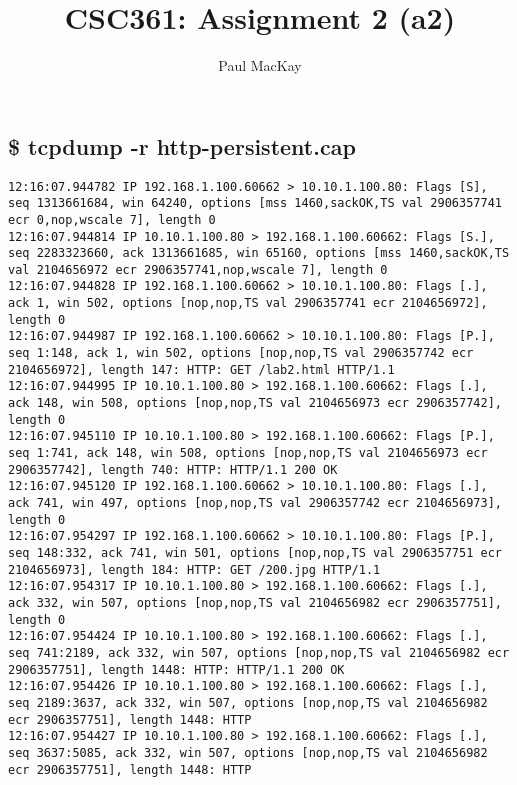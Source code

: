 \documentclass{article}
\title{CSC361: Assignment 2 (a2)}
\author{Paul MacKay}
\begin{document}
\maketitle

\section{}
\subsection{\$ tcpdump -r http-persistent.cap}
{\scriptsize
\begin{lstlisting}
12:16:07.944782 IP 192.168.1.100.60662 > 10.10.1.100.80: Flags [S], seq 1313661684, win 64240, options [mss 1460,sackOK,TS val 2906357741 ecr 0,nop,wscale 7], length 0
12:16:07.944814 IP 10.10.1.100.80 > 192.168.1.100.60662: Flags [S.], seq 2283323660, ack 1313661685, win 65160, options [mss 1460,sackOK,TS val 2104656972 ecr 2906357741,nop,wscale 7], length 0
12:16:07.944828 IP 192.168.1.100.60662 > 10.10.1.100.80: Flags [.], ack 1, win 502, options [nop,nop,TS val 2906357741 ecr 2104656972], length 0
12:16:07.944987 IP 192.168.1.100.60662 > 10.10.1.100.80: Flags [P.], seq 1:148, ack 1, win 502, options [nop,nop,TS val 2906357742 ecr 2104656972], length 147: HTTP: GET /lab2.html HTTP/1.1
12:16:07.944995 IP 10.10.1.100.80 > 192.168.1.100.60662: Flags [.], ack 148, win 508, options [nop,nop,TS val 2104656973 ecr 2906357742], length 0
12:16:07.945110 IP 10.10.1.100.80 > 192.168.1.100.60662: Flags [P.], seq 1:741, ack 148, win 508, options [nop,nop,TS val 2104656973 ecr 2906357742], length 740: HTTP: HTTP/1.1 200 OK
12:16:07.945120 IP 192.168.1.100.60662 > 10.10.1.100.80: Flags [.], ack 741, win 497, options [nop,nop,TS val 2906357742 ecr 2104656973], length 0
12:16:07.954297 IP 192.168.1.100.60662 > 10.10.1.100.80: Flags [P.], seq 148:332, ack 741, win 501, options [nop,nop,TS val 2906357751 ecr 2104656973], length 184: HTTP: GET /200.jpg HTTP/1.1
12:16:07.954317 IP 10.10.1.100.80 > 192.168.1.100.60662: Flags [.], ack 332, win 507, options [nop,nop,TS val 2104656982 ecr 2906357751], length 0
12:16:07.954424 IP 10.10.1.100.80 > 192.168.1.100.60662: Flags [.], seq 741:2189, ack 332, win 507, options [nop,nop,TS val 2104656982 ecr 2906357751], length 1448: HTTP: HTTP/1.1 200 OK
12:16:07.954426 IP 10.10.1.100.80 > 192.168.1.100.60662: Flags [.], seq 2189:3637, ack 332, win 507, options [nop,nop,TS val 2104656982 ecr 2906357751], length 1448: HTTP
12:16:07.954427 IP 10.10.1.100.80 > 192.168.1.100.60662: Flags [.], seq 3637:5085, ack 332, win 507, options [nop,nop,TS val 2104656982 ecr 2906357751], length 1448: HTTP

\end{lstlisting}}
\end{document}
